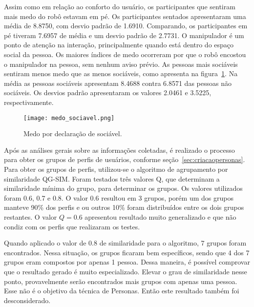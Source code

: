 Assim como em relação ao conforto do usuário, os participantes que sentiram mais medo do robô estavam em pé. Os participantes sentados apresentaram uma média de 8.8750, com desvio padrão de 1.6910. Comparando, os participantes em pé tiveram 7.6957 de média e um desvio padrão de 2.7731. O manipulador é um ponto de atenção na interação, principalmente quando está dentro do espaço social da pessoa. Os maiores índices de medo ocorreram por que o robô encostou o manipulador na pessoa, sem nenhum aviso prévio. As pessoas mais sociáveis sentiram menos medo que as menos sociáveis, como apresenta na figura~\ref{fig:medosociavel}. Na média as pessoas sociáveis apresentam 8.4688 contra 6.8571 das pessoas não sociáveis. Os desvios padrão apresentaram os valores 2.0461 e 3.5225, respectivamente.

\begin{figure}[ht!]
	\centering
	\begin{minipage}{0.65\textwidth}
		\caption{Medo por declaração de sociável.}
		\texttt{[image: medo\_sociavel.png]}
		\label{fig:medosociavel}
	\end{minipage}
\end{figure}

Após as análises gerais sobre as informações coletadas, é realizado o processo para obter os grupos de perfis de usuários, conforme seção~\ref{sec:criacaopersonas}. Para obter os grupos de perfis, utilizou-se o algoritmo de agrupamento por similaridade QG-SIM. Foram testados três valores Q, que determinam a similaridade mínima do grupo, para determinar os grupos. Os valores utilizados foram 0.6, 0.7 e 0.8. O valor 0.6 resultou em 3 grupos, porém um dos grupos manteve 90\% dos perfis e ou outros 10\% foram distribuídos entre os dois grupos restantes. O valor $Q = 0.6$ apresentou resultado muito generalizado e que não condiz com os perfis que realizaram os testes.

Quando aplicado o valor de 0.8 de similaridade para o algoritmo, 7 grupos foram encontrados. Nessa situação, os grupos ficaram bem específicos, sendo que 4 dos 7 grupos eram compostos por apenas 1 pessoa. Dessa maneira, é possível comprovar que o resultado gerado é muito especializado. Elevar o grau de similaridade nesse ponto, provavelmente serão encontrados mais grupos com apenas uma pessoa. Esse não é o objetivo da técnica de Personas. Então este resultado também foi desconsiderado.

